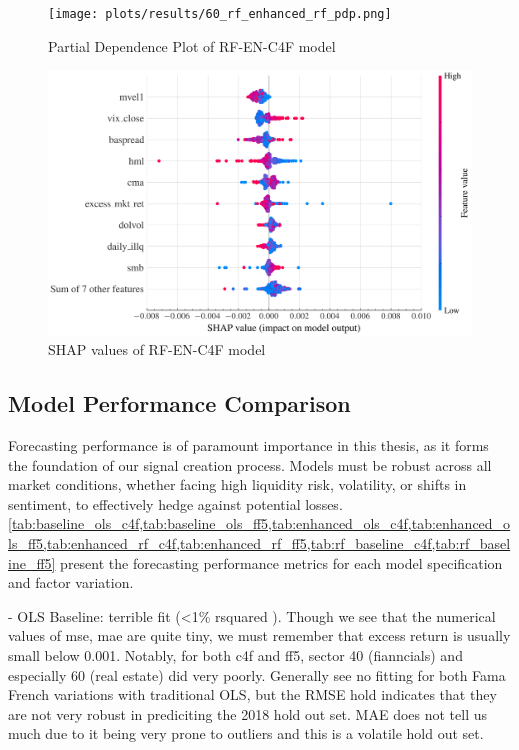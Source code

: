 \begin{figure}[H]
    \centering
    \texttt{[image: plots/results/60\_rf\_enhanced\_rf\_pdp.png]}
    \caption{Partial Dependence Plot of RF-EN-C4F model}\label{fig:60_rf_enhanced_rf_pdp}
\end{figure}

\begin{figure}[H]
    \centering
    \includegraphics[width=\textwidth]{plots/results/60_rf_enhanced_shap_plot.png}
    \caption{SHAP values of RF-EN-C4F model}\label{fig:60_rf_enhanced_shap_plot}
\end{figure}




\subsection{Model Performance Comparison}
Forecasting performance is of paramount importance in this thesis, as it forms the foundation of our signal creation process. Models must be robust across all market conditions, whether facing high liquidity risk, volatility, or shifts in sentiment, to effectively hedge against potential losses. \cref{tab:baseline_ols_c4f,tab:baseline_ols_ff5,tab:enhanced_ols_c4f,tab:enhanced_ols_ff5,tab:enhanced_rf_c4f,tab:enhanced_rf_ff5,tab:rf_baseline_c4f,tab:rf_baseline_ff5} present the forecasting performance metrics for each model specification and factor variation.

- OLS Baseline: terrible fit (<1\% rsquared ). Though we see that the numerical values of mse, mae are quite tiny, we must remember that excess return is usually small below 0.001. Notably, for both c4f and ff5, sector 40 (fianncials) and especially 60 (real estate) did very poorly. Generally see no fitting for both Fama French variations with traditional OLS, but the RMSE hold indicates that they are not very robust in prediciting the 2018 hold out set. MAE does not tell us much due to it being very prone to outliers and this is a volatile hold out set.

